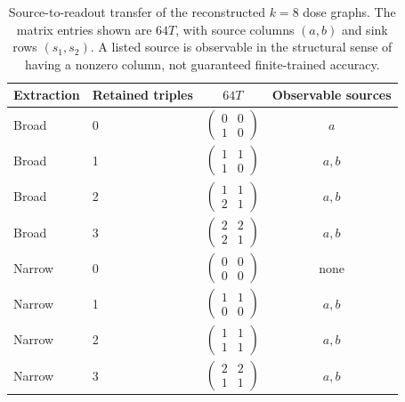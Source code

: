 \documentclass[10pt,letterpaper]{article}
\begin{document}
\begin{table}[H]\centering
\caption{Source-to-readout transfer of the reconstructed $k=8$ dose graphs.
The matrix entries shown are $64T$, with source columns $(a,b)$ and sink
rows $(s_1,s_2)$. A listed source is observable in the structural sense of
having a nonzero column, not guaranteed finite-trained accuracy.}
\small
\begin{tabular}{llcc}\toprule
Extraction & Retained triples & $64T$ & Observable sources\\\midrule
Broad & 0 & $\left(\begin{smallmatrix}0&0\\1&0\end{smallmatrix}\right)$ & $a$\\[5pt]
Broad & 1 & $\left(\begin{smallmatrix}1&1\\1&0\end{smallmatrix}\right)$ & $a,b$\\[5pt]
Broad & 2 & $\left(\begin{smallmatrix}1&1\\2&1\end{smallmatrix}\right)$ & $a,b$\\[5pt]
Broad & 3 & $\left(\begin{smallmatrix}2&2\\2&1\end{smallmatrix}\right)$ & $a,b$\\[5pt]
Narrow & 0 & $\left(\begin{smallmatrix}0&0\\0&0\end{smallmatrix}\right)$ & none\\[5pt]
Narrow & 1 & $\left(\begin{smallmatrix}1&1\\0&0\end{smallmatrix}\right)$ & $a,b$\\[5pt]
Narrow & 2 & $\left(\begin{smallmatrix}1&1\\1&1\end{smallmatrix}\right)$ & $a,b$\\[5pt]
Narrow & 3 & $\left(\begin{smallmatrix}2&2\\1&1\end{smallmatrix}\right)$ & $a,b$\\
\bottomrule\end{tabular}
\end{table}
\end{document}

